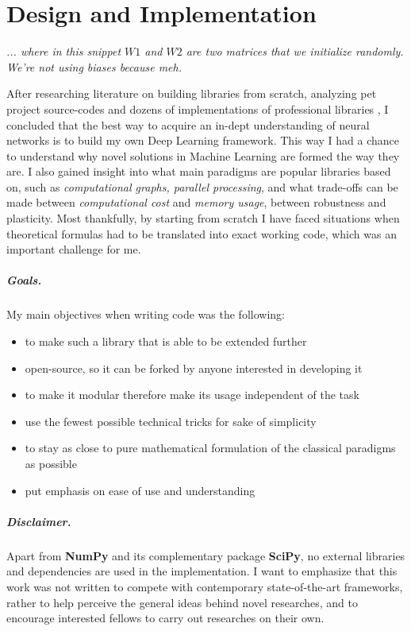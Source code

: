 \chapter{Design and Implementation}

\epigraph{\textit{... where in this snippet $W1$ and $W2$ are two matrices that we initialize randomly. We're not using biases because meh.}}{}

After researching literature on building libraries from scratch, analyzing pet project source-codes \cite{convnetjs, gibianskysource} and dozens of implementations of professional libraries \cite{TF, caffe, torch},
I concluded that the best way to acquire an in-dept understanding of neural networks is to build my own Deep Learning framework.
This way I had a chance to understand why novel solutions in Machine Learning are formed the way they are.
I also gained insight into what main paradigms are popular libraries based on, such as \emph{computational graphs, parallel processing}, 
and what trade-offs can be made between \emph{computational cost} and \emph{memory usage}, between robustness and plasticity.
Most thankfully, by starting from scratch I have faced situations when theoretical formulas had to be translated into exact working code, which was an important challenge for me.

\paragraph{Goals.} My main objectives when writing code was the following:
\begin{itemize}
    \item[] to make such a library that is able to be extended further
    \item[] open-source, so it can be forked by anyone interested in developing it
    \item[] to make it modular therefore make its usage independent of the task
    \item[] use the fewest possible technical tricks for sake of simplicity
    \item[] to stay as close to pure mathematical formulation of the classical paradigms as possible
    \item[] put emphasis on ease of use and understanding
\end{itemize}
\paragraph{Disclaimer.} Apart from \textbf{NumPy} and its complementary package \textbf{SciPy}, no external libraries and dependencies are used in the implementation. 
I want to emphasize that this work was not written to compete with contemporary state-of-the-art frameworks, rather to help perceive the general ideas behind novel researches, and to encourage interested fellows to carry out researches on their own.
\clearpage

